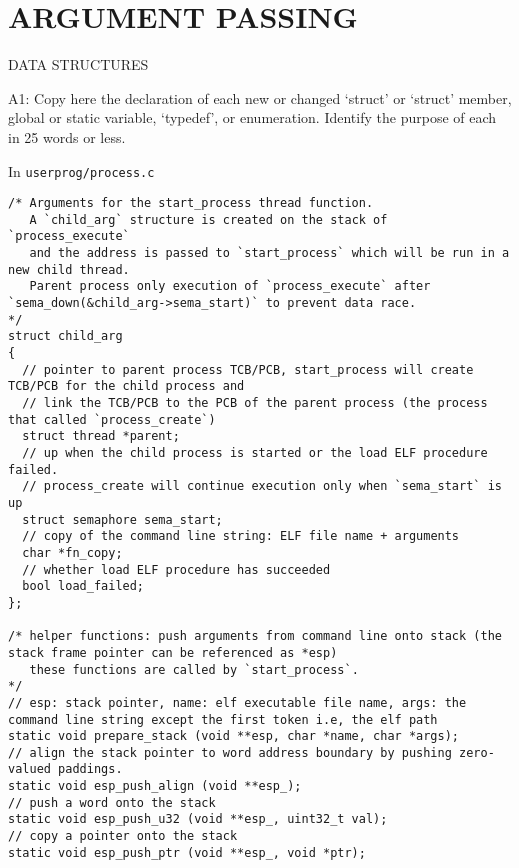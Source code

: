 
\section{ARGUMENT PASSING}

\begin{aspect}{DATA STRUCTURES}
	\begin{qc}
		A1: Copy here the declaration of each new or changed
		`struct' or `struct' member, global or static variable, `typedef', or enumeration.
		Identify the purpose of each in 25 words or less.
	\end{qc}
	In \lstinline{userprog/process.c}
	\begin{lstlisting}
/* Arguments for the start_process thread function.
   A `child_arg` structure is created on the stack of `process_execute`
   and the address is passed to `start_process` which will be run in a new child thread.
   Parent process only execution of `process_execute` after `sema_down(&child_arg->sema_start)` to prevent data race.
*/
struct child_arg
{
  // pointer to parent process TCB/PCB, start_process will create TCB/PCB for the child process and
  // link the TCB/PCB to the PCB of the parent process (the process that called `process_create`)
  struct thread *parent;
  // up when the child process is started or the load ELF procedure failed.
  // process_create will continue execution only when `sema_start` is up
  struct semaphore sema_start;
  // copy of the command line string: ELF file name + arguments
  char *fn_copy;               
  // whether load ELF procedure has succeeded
  bool load_failed;
};

/* helper functions: push arguments from command line onto stack (the stack frame pointer can be referenced as *esp)
   these functions are called by `start_process`.
*/
// esp: stack pointer, name: elf executable file name, args: the command line string except the first token i.e, the elf path
static void prepare_stack (void **esp, char *name, char *args);
// align the stack pointer to word address boundary by pushing zero-valued paddings.
static void esp_push_align (void **esp_);
// push a word onto the stack
static void esp_push_u32 (void **esp_, uint32_t val);
// copy a pointer onto the stack
static void esp_push_ptr (void **esp_, void *ptr);
	\end{lstlisting}
\end{aspect}

